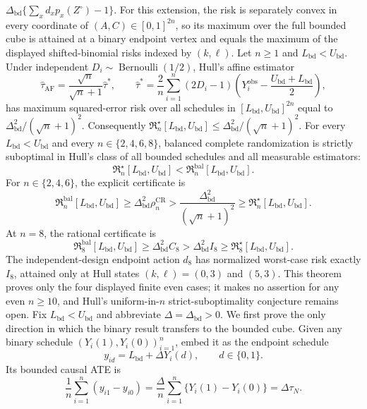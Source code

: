 \(
 \Delta_{\mathrm{bd}}\{\sum_xd_xp_x(Z^\circ)-1\}.
\)
For this extension, the risk is separately convex in every coordinate of \((A,C)\in[0,1]^{2n}\), so its maximum over the full bounded cube is attained at a binary endpoint vertex and equals the maximum of the displayed shifted-binomial risks indexed by \((k,\ell)\).
Let \(n\geq1\) and \(L_{\mathrm{bd}}<U_{\mathrm{bd}}\).  Under independent \(D_i\sim\operatorname{Bernoulli}(1/2)\), Hull's affine estimator
\[
 \widehat\tau_{\mathrm{AF}}
 =\frac{\sqrt n}{\sqrt n+1}\widehat\tau^*,\qquad
 \widehat\tau^*=\frac2n\sum_{i=1}^n(2D_i-1)
 \left(Y_i^{\mathrm{obs}}-\frac{U_{\mathrm{bd}}+L_{\mathrm{bd}}}{2}\right),
\]
has maximum squared-error risk over all schedules in \([L_{\mathrm{bd}},U_{\mathrm{bd}}]^{2n}\) equal to
\(
 \Delta_{\mathrm{bd}}^2/(\sqrt n+1)^2.
\)
Consequently \(\mathfrak R_n^\star[L_{\mathrm{bd}},U_{\mathrm{bd}}]\leq\Delta_{\mathrm{bd}}^2/(\sqrt n+1)^2\).
For every \(L_{\mathrm{bd}}<U_{\mathrm{bd}}\) and every \(n\in\{2,4,6,8\}\), balanced complete randomization is strictly suboptimal in Hull's class of all bounded schedules and all measurable estimators:
\[
 \mathfrak R_n^\star[L_{\mathrm{bd}},U_{\mathrm{bd}}]
 <\mathfrak R_n^{\mathrm{bal}}[L_{\mathrm{bd}},U_{\mathrm{bd}}].
\]
For \(n\in\{2,4,6\}\), the explicit certificate is
\[
 \mathfrak R_n^{\mathrm{bal}}[L_{\mathrm{bd}},U_{\mathrm{bd}}]
 \geq\Delta_{\mathrm{bd}}^2\rho_n^{\mathrm{CR}}
 >\frac{\Delta_{\mathrm{bd}}^2}{(\sqrt n+1)^2}
 \geq\mathfrak R_n^\star[L_{\mathrm{bd}},U_{\mathrm{bd}}].
\]
At \(n=8\), the rational certificate is
\[
 \mathfrak R_8^{\mathrm{bal}}[L_{\mathrm{bd}},U_{\mathrm{bd}}]
 \geq\Delta_{\mathrm{bd}}^2 C_8
 >\Delta_{\mathrm{bd}}^2 I_8
 \geq\mathfrak R_8^\star[L_{\mathrm{bd}},U_{\mathrm{bd}}].
\]
The independent-design endpoint action \(d_8\) has normalized worst-case risk exactly \(I_8\), attained only at Hull states \((k,\ell)=(0,3)\) and \((5,3)\).  This theorem proves only the four displayed finite even cases; it makes no assertion for any even \(n\geq10\), and Hull's uniform-in-\(n\) strict-suboptimality conjecture remains open.
Fix \(L_{\mathrm{bd}}<U_{\mathrm{bd}}\) and abbreviate \(\Delta=\Delta_{\mathrm{bd}}>0\).  We first prove the only direction in which the binary result transfers to the bounded cube.  Given any binary schedule \((Y_i(1),Y_i(0))_{i=1}^n\), embed it as the endpoint schedule
\[
 y_{id}=L_{\mathrm{bd}}+\Delta Y_i(d),\qquad d\in\{0,1\}.
\]
Its bounded causal ATE is
\[
 \frac1n\sum_{i=1}^n(y_{i1}-y_{i0})
 =\frac\Delta n\sum_{i=1}^n\{Y_i(1)-Y_i(0)\}
 =\Delta\tau_N.
\]
